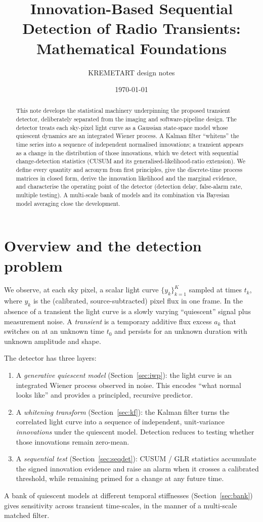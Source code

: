 \documentclass[11pt]{article}
\title{Innovation-Based Sequential Detection of Radio Transients:\\
Mathematical Foundations}
\author{KREMETART design notes}
\date{\today}
\begin{document}
\maketitle

\begin{abstract}
This note develops the statistical machinery underpinning the proposed transient
detector, deliberately separated from the imaging and software-pipeline design.
The detector treats each sky-pixel light curve as a Gaussian state-space model whose
quiescent dynamics are an integrated Wiener process. A Kalman filter ``whitens''
the time series into a sequence of independent normalised innovations; a transient
appears as a change in the distribution of those innovations, which we detect with
sequential change-detection statistics (CUSUM and its generalised-likelihood-ratio
extension). We define every quantity and acronym from first principles, give the
discrete-time process matrices in closed form, derive the innovation likelihood and
the marginal evidence, and characterise the operating point of the detector
(detection delay, false-alarm rate, multiple testing). A multi-scale bank of models
and its combination via Bayesian model averaging close the development.
\end{abstract}

\section{Overview and the detection problem}

We observe, at each sky pixel, a scalar light curve $\{y_k\}_{k=1}^{K}$ sampled at
times $t_k$, where $y_k$ is the (calibrated, source-subtracted) pixel flux in one
frame. In the absence of a transient the light curve is a slowly varying
``quiescent'' signal plus measurement noise. A \emph{transient} is a temporary
additive flux excess $a_k$ that switches on at an unknown time $t_0$ and persists for
an unknown duration with unknown amplitude and shape.

The detector has three layers:
\begin{enumerate}[leftmargin=*]
  \item A \emph{generative quiescent model} (Section~\ref{sec:iwp}): the light curve
        is an integrated Wiener process observed in noise. This encodes ``what normal
        looks like'' and provides a principled, recursive predictor.
  \item A \emph{whitening transform} (Section~\ref{sec:kf}): the Kalman filter turns
        the correlated light curve into a sequence of independent, unit-variance
        \emph{innovations} under the quiescent model. Detection reduces to testing
        whether those innovations remain zero-mean.
  \item A \emph{sequential test} (Section~\ref{sec:seqdet}): CUSUM / GLR statistics
        accumulate the signed innovation evidence and raise an alarm when it crosses
        a calibrated threshold, while remaining primed for a change at any future
        time.
\end{enumerate}
A bank of quiescent models at different temporal stiffnesses
(Section~\ref{sec:bank}) gives sensitivity across transient time-scales, in the
manner of a multi-scale matched filter.
\end{document}
